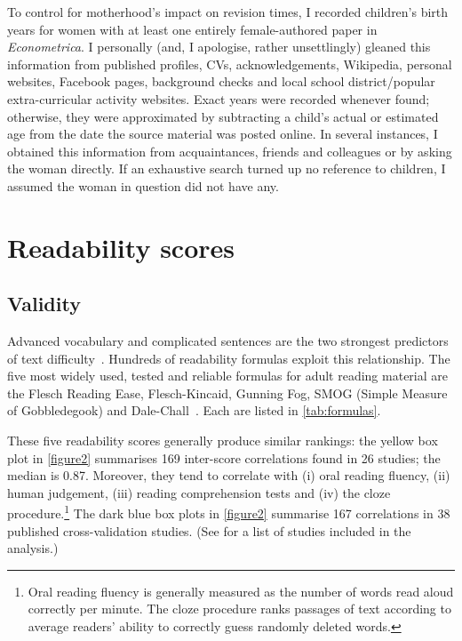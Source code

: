 \begin{appendices}
\begin{refsection}
To control for motherhood's impact on revision times, I recorded children's birth years for women with at least one entirely female-authored paper in \emph{Econometrica}. I personally (and, I apologise, rather unsettlingly) gleaned this information from published profiles, CVs, acknowledgements, Wikipedia, personal websites, Facebook pages, background checks and local school district\slash popular extra-curricular activity websites. Exact years were recorded whenever found; otherwise, they were approximated by subtracting a child's actual or estimated age from the date the source material was posted online. In several instances, I obtained this information from acquaintances, friends and colleagues or by asking the woman directly. If an exhaustive search turned up no reference to children, I assumed the woman in question did not have any.

\clearpage

\section{Readability scores}
\label{appendixreadability}

\subsection{Validity}
\label{appendixvalidity}

Advanced vocabulary and complicated sentences are the two strongest predictors of text difficulty~\citep{Chall1995}. Hundreds of readability formulas exploit this relationship. The five most widely used, tested and reliable formulas for adult reading material are the Flesch Reading Ease, Flesch-Kincaid, Gunning Fog, SMOG (Simple Measure of Gobbledegook) and Dale-Chall~\citep{DuBay2004}. Each are listed in \autoref{tab:formulas}.

These five readability scores generally produce similar rankings: the yellow box plot in \autoref{figure2} summarises 169 inter-score correlations found in 26 studies; the median is 0.87. Moreover, they tend to correlate with (i) oral reading fluency, (ii) human judgement, (iii) reading comprehension tests and (iv) the cloze procedure.\footnote{Oral reading fluency is generally measured as the number of words read aloud correctly per minute. The cloze procedure ranks passages of text according to average readers' ability to correctly guess randomly deleted words.} The dark blue box plots in \autoref{figure2} summarise 167 correlations in 38 published cross-validation studies. (See  for a list of studies included in the analysis.)


\end{refsection}
\end{appendices}
